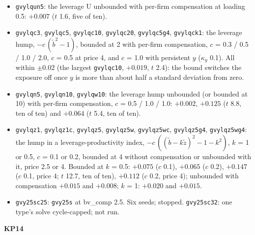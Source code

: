 \documentclass[11pt]{article}
\begin{document}
\begin{itemize}
\item \texttt{gvylqun5}: the leverage U unbounded with per-firm compensation at loading 0.5: $+0.007$ ($t$ 1.6, five of ten).
\item \texttt{gvylqc3}, \texttt{gvylqc5}, \texttt{gvylqc10}, \texttt{gvylqc20}, \texttt{gvylqc5g4}, \texttt{gvylqck1}: the leverage hump, $-c\,(\tilde b^2 - 1)$, bounded at 2 with per-firm compensation, $c$ = 0.3 / 0.5 / 1.0 / 2.0, $c$ = 0.5 at price 4, and $c$ = 1.0 with persistent $y$ ($\kappa_y$ 0.1). All within $\pm0.02$ (the largest \texttt{gvylqc10}, $+0.019$, $t$ 2.4): the bound switches the exposure off once $y$ is more than about half a standard deviation from zero.
\item \texttt{gvylqn5}, \texttt{gvylqn10}, \texttt{gvylqw10}: the leverage hump unbounded (or bounded at 10) with per-firm compensation, $c$ = 0.5 / 1.0 / 1.0: $+0.002$, $+0.125$ ($t$ 8.8, ten of ten) and $+0.064$ ($t$ 5.4, ten of ten).
\item \texttt{gvylqz1}, \texttt{gvylqz1c}, \texttt{gvylqz5}, \texttt{gvylqz5w}, \texttt{gvylqz5wc}, \texttt{gvylqz5g4}, \texttt{gvylqz5wg4}: the hump in a leverage-productivity index, $-c\,((\tilde b - k\tilde z)^2 - 1 - k^2)$, $k$ = 1 or 0.5, $c$ = 0.1 or 0.2, bounded at 4 without compensation or unbounded with it, price 2.5 or 4. Bounded at $k$ = 0.5: $+0.075$ ($c$ 0.1), $+0.065$ ($c$ 0.2), $+0.147$ ($c$ 0.1, price 4; $t$ 12.7, ten of ten), $+0.112$ ($c$ 0.2, price 4); unbounded with compensation $+0.015$ and $+0.008$; $k$ = 1: $+0.020$ and $+0.015$.
\item \texttt{gvy25sc25}: \texttt{gvy25s} at bv\_comp 2.5. Six seeds; stopped. \texttt{gvy25sc32}: one type's solve cycle-capped; not run.
\end{itemize}
\noindent\textbf{KP14}
\end{document}
